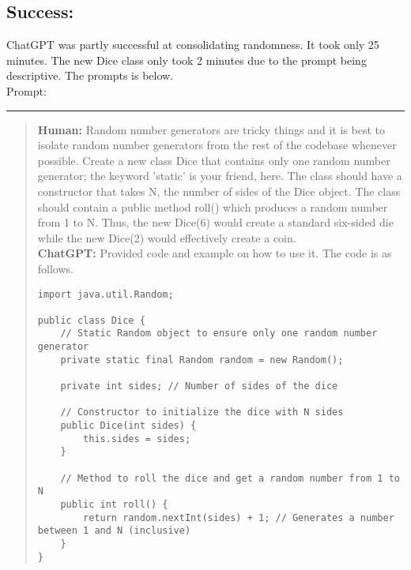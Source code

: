 \documentclass[a4paper,11pt]{article}
\begin{document}
\subsection*{Success:}
ChatGPT was partly successful at consolidating randomness. It took only 25 minutes. The new Dice class only took 2 minutes due to the prompt being descriptive. The prompts is below.\\
Prompt:\\
\hrule
\vspace{4pt} %
\begin{quote}
\textbf{Human:} Random number generators are tricky things and it is best to isolate random number generators from the rest of the codebase whenever possible. Create a new class Dice that contains only one random number generator; the keyword 'static' is your friend, here. The class should have a constructor that takes N, the number of sides of the Dice object. The class should contain a public method roll() which produces a random number from 1 to N. Thus, the new Dice(6) would create a standard six-sided die while the new Dice(2) would effectively create a coin. \\
\textbf{ChatGPT:} Provided code and example on how to use it. The code is as follows. 
\begin{lstlisting}
import java.util.Random;

public class Dice {
    // Static Random object to ensure only one random number generator
    private static final Random random = new Random();
    
    private int sides; // Number of sides of the dice
    
    // Constructor to initialize the dice with N sides
    public Dice(int sides) {
        this.sides = sides;
    }
    
    // Method to roll the dice and get a random number from 1 to N
    public int roll() {
        return random.nextInt(sides) + 1; // Generates a number between 1 and N (inclusive)
    }
}
\end{lstlisting} 
\end{quote}
\end{document}
